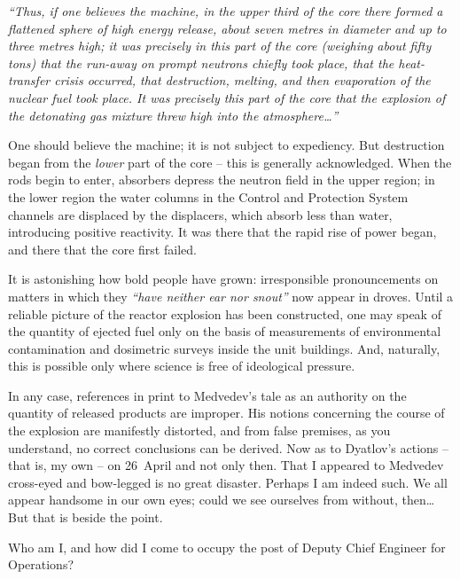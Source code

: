 \documentclass[openright]{bookest}
\begin{document}
\begin{personal}
\textit{``Thus, if one believes the machine, in the upper third of the core there formed a flattened sphere of high energy release, about seven metres in diameter and up to three metres high; it was precisely in this part of the core (weighing about fifty tons) that the run-away on prompt neutrons chiefly took place, that the heat-transfer crisis occurred, that destruction, melting, and then evaporation of the nuclear fuel took place. It was precisely this part of the core that the explosion of the detonating gas mixture threw high into the atmosphere\ldots''}
\end{personal}

One should believe the machine; it is not subject to expediency. But destruction began from the \textit{lower} part of the core -- this is generally acknowledged. When the rods begin to enter, absorbers depress the neutron field in the upper region; in the lower region the water columns in the Control and Protection System channels are displaced by the displacers, which absorb less than water, introducing positive reactivity. It was there that the rapid rise of power began, and there that the core first failed.

It is astonishing how bold people have grown: irresponsible pronouncements on matters in which they \textit{``have neither ear nor snout''} now appear in droves. Until a reliable picture of the reactor explosion has been constructed, one may speak of the quantity of ejected fuel only on the basis of measurements of environmental contamination and dosimetric surveys inside the unit buildings. And, naturally, this is possible only where science is free of ideological pressure.

In any case, references in print to Medvedev's tale as an authority on the quantity of released products are improper. His notions concerning the course of the explosion are manifestly distorted, and from false premises, as you understand, no correct conclusions can be derived. Now as to Dyatlov's actions -- that is, my own -- on 26~April and not only then. That I appeared to Medvedev cross-eyed and bow-legged is no great disaster. Perhaps I am indeed such. We all appear handsome in our own eyes; could we see ourselves from without, then\ldots\,But that is beside the point.

Who am I, and how did I come to occupy the post of Deputy Chief Engineer for Operations?
\end{document}
